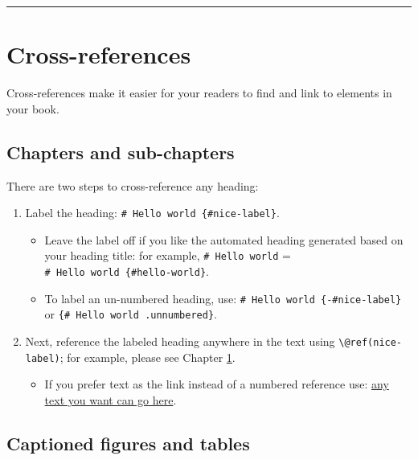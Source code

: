 \documentclass[
]{book}
\providecommand{\tightlist}{%
  \setlength{\itemsep}{0pt}\setlength{\parskip}{0pt}}
\theoremstyle{definition}
\theoremstyle{definition}
\theoremstyle{definition}
\theoremstyle{definition}
\theoremstyle{remark}
\begin{document}
\begin{center}\rule{0.5\linewidth}{0.5pt}\end{center}

\hypertarget{cross}{%
\chapter{Cross-references}\label{cross}}

Cross-references make it easier for your readers to find and link to elements in your book.

\hypertarget{chapters-and-sub-chapters}{%
\section{Chapters and sub-chapters}\label{chapters-and-sub-chapters}}

There are two steps to cross-reference any heading:

\begin{enumerate}
\def\labelenumi{\arabic{enumi}.}
\tightlist
\item
  Label the heading: \texttt{\#\ Hello\ world\ \{\#nice-label\}}.

  \begin{itemize}
  \tightlist
  \item
    Leave the label off if you like the automated heading generated based on your heading title: for example, \texttt{\#\ Hello\ world} = \texttt{\#\ Hello\ world\ \{\#hello-world\}}.
  \item
    To label an un-numbered heading, use: \texttt{\#\ Hello\ world\ \{-\#nice-label\}} or \texttt{\{\#\ Hello\ world\ .unnumbered\}}.
  \end{itemize}
\item
  Next, reference the labeled heading anywhere in the text using \texttt{\textbackslash{}@ref(nice-label)}; for example, please see Chapter \ref{cross}.

  \begin{itemize}
  \tightlist
  \item
    If you prefer text as the link instead of a numbered reference use: \protect\hyperlink{cross}{any text you want can go here}.
  \end{itemize}
\end{enumerate}

\hypertarget{captioned-figures-and-tables}{%
\section{Captioned figures and tables}\label{captioned-figures-and-tables}}
\end{document}
